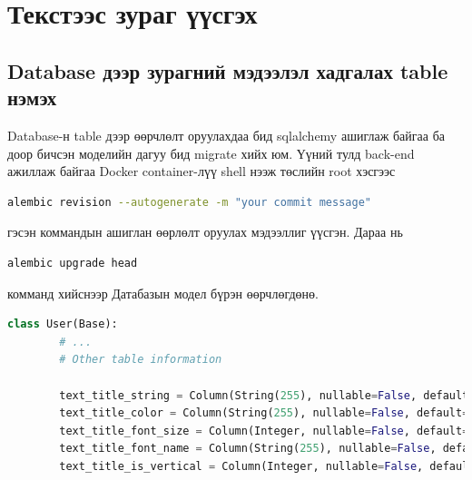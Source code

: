 \section{Текстээс зураг үүсгэх}
\subsection{Database дээр зурагний мэдээлэл хадгалах table нэмэх}
Database-н table дээр өөрчлөлт оруулахдаа бид sqlalchemy ашиглаж байгаа ба доор бичсэн моделийн дагуу бид migrate хийх юм. Үүний тулд back-end ажиллаж байгаа Docker container-лүү shell нээж төслийн root хэсгээс
\begin{lstlisting}[language=bash]
	alembic revision --autogenerate -m "your commit message"
\end{lstlisting}
гэсэн коммандын ашиглан өөрлөлт оруулах мэдээллиг үүсгэн. Дараа нь
\begin{lstlisting}[language=bash]
	alembic upgrade head
\end{lstlisting}
комманд хийснээр Датабазын модел бүрэн өөрчлөгдөнө.

\begin{lstlisting}[language=Python,caption={Table-рүү оруулсан өөрчлөлт},frame=single]
	class User(Base):
		# ...
		# Other table information

		text_title_string = Column(String(255), nullable=False, default="")
		text_title_color = Column(String(255), nullable=False, default="#000000")
		text_title_font_size = Column(Integer, nullable=False, default=0)
		text_title_font_name = Column(String(255), nullable=False, default="")
		text_title_is_vertical = Column(Integer, nullable=False, default=0)
	\end{lstlisting}

